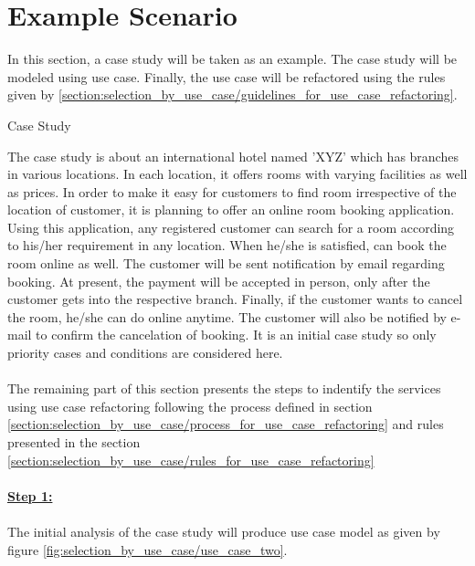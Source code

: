 \section{Example Scenario}\label{section:selection_by_use_case/refactoring_example}
In this section, a case study will be taken as an example. The case study will be modeled using use case. Finally, the use case will be refactored using the rules given by \ref{section:selection_by_use_case/guidelines_for_use_case_refactoring}.
\\
\begin{shaded} Case Study \end{shaded}
The case study is about an international hotel named 'XYZ' which has branches in various locations. In each location, it offers rooms with varying facilities as well as prices. In order to make it easy for customers to find room irrespective of the location of customer, it is planning to offer an online room booking application. Using this application, any registered customer can search for a room according to his/her requirement in any location. When he/she is satisfied, can book the room online as well. The customer will be sent notification by email regarding booking. At present, the payment will be accepted in person, only after the customer gets into the respective branch. Finally, if the customer wants to cancel the room, he/she can do online anytime. The customer will also be notified by e-mail to confirm the cancelation of booking. It is an initial case study so only priority cases and conditions are considered here.
\\
\\
The remaining part of this section presents the steps to indentify the services using use case refactoring following the process defined in section \ref{section:selection_by_use_case/process_for_use_case_refactoring} and rules presented in the section \ref{section:selection_by_use_case/rules_for_use_case_refactoring}
\\
\\
\textbf{\underline{Step 1:}}
\\
\\
The initial analysis of the case study will produce use case model as given by figure \ref{fig:selection_by_use_case/use_case_two}.


